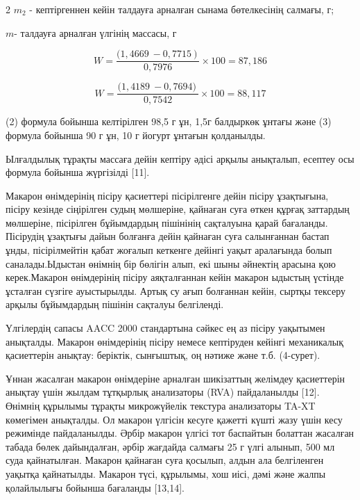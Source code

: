 \begin{multicols}{2}
\(m_{2}\) - кептіргеннен кейін талдауға арналған сынама бөтелкесінің
салмағы, г;

\(m\)- талдауға арналған үлгінің массасы, г

\begin{equation}
W = \frac{{(1,4669}^{\ } - {0,7715}^{\ })\ }{0,7976} \times 100 = 87,186
\end{equation}

\begin{equation}
W = \frac{{(1,4189}^{\ } - 0,7694)\ }{0,7542} \times 100 = 88,117
\end{equation}

(2) формула бойынша келтірілген 98,5 г ұн, 1,5г балдыркөк ұнтағы және
(3) формула бойынша 90 г ұн, 10 г йогурт ұнтағын қолданылды.

Ылғалдылық тұрақты массаға дейін кептіру әдісі арқылы анықталып, есептеу
осы формула бойынша жүргізілді {[}11{]}.

Макарон өнімдерінің пісіру қасиеттері пісірілгенге дейін пісіру
ұзақтығына, пісіру кезінде сіңірілген судың мөлшеріне, қайнаған суға
өткен құрғақ заттардың мөлшеріне, пісірілген бұйымдардың пішінінің
сақталуына қарай бағаланды. Пісірудің ұзақтығы дайын болғанға дейін
қайнаған суға салынғаннан бастап ұнды, пісірілмейтін қабат жоғалып
кеткенге дейінгі уақыт аралағында болып саналады.Ыдыстан өнімнің бір
бөлігін алып, екі шыны әйнектің арасына қою керек.Макарон өнімдерінің
пісіру аяқталғаннан кейін макарон ыдыстың үстінде ұсталған сүзгіге
ауыстырылды. Артық су ағып болғаннан кейін, сыртқы тексеру арқылы
бұйымдардың пішінін сақталуы белгіленді.

Үлгілердің сапасы AACC 2000 стандартына сәйкес ең аз пісіру уақытымен
анықталды. Макарон өнімдерінің пісіру немесе кептіруден кейінгі
механикалық қасиеттерін анықтау: беріктік, сынғыштық, оң нәтиже және
т.б. (4-сурет).

Ұннан жасалған макарон өнімдеріне арналған шикізаттың желімдеу
қасиеттерін анықтау үшін жылдам тұтқырлық анализаторы (RVA) пайдаланылды
{[}12{]}. Өнімнің құрылымы тұрақты микрожүйелік текстура анализаторы
TA-XT көмегімен анықталды. Ол макарон үлгісін кесуге қажетті күшті жазу
үшін кесу режимінде пайдаланылды. Әрбір макарон үлгісі тот баспайтын
болаттан жасалған табада бөлек дайындалған, әрбір жағдайда салмағы 25 г
үлгі алынып, 500 мл суда қайнатылған. Макарон қайнаған суға қосылып,
алдын ала белгіленген уақытқа қайнатылды. Макарон түсі, құрылымы, хош
иісі, дәмі және жалпы қолайлылығы бойынша бағаланды {[}13,14{]}.
\end{multicols}

